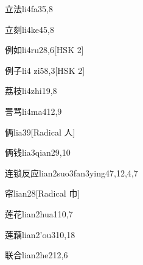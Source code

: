 \begin{entry}{立法}{li4fa3}{5,8}
\end{entry}

\begin{entry}{立刻}{li4ke4}{5,8}
\end{entry}

\begin{entry}{例如}{li4ru2}{8,6}[HSK 2]
\end{entry}

\begin{entry}{例子}{li4 zi5}{8,3}[HSK 2]
\end{entry}

\begin{entry}{荔枝}{li4zhi1}{9,8}
\end{entry}

\begin{entry}{詈骂}{li4ma4}{12,9}
\end{entry}

\begin{entry}{俩}{lia3}{9}[Radical 人]
\end{entry}

\begin{entry}{俩钱}{lia3qian2}{9,10}
\end{entry}

\begin{entry}{连锁反应}{lian2suo3fan3ying4}{7,12,4,7}
\end{entry}

\begin{entry}{帘}{lian2}{8}[Radical 巾]
\end{entry}

\begin{entry}{莲花}{lian2hua1}{10,7}
\end{entry}

\begin{entry}{莲藕}{lian2'ou3}{10,18}
\end{entry}

\begin{entry}{联合}{lian2he2}{12,6}
\end{entry}

